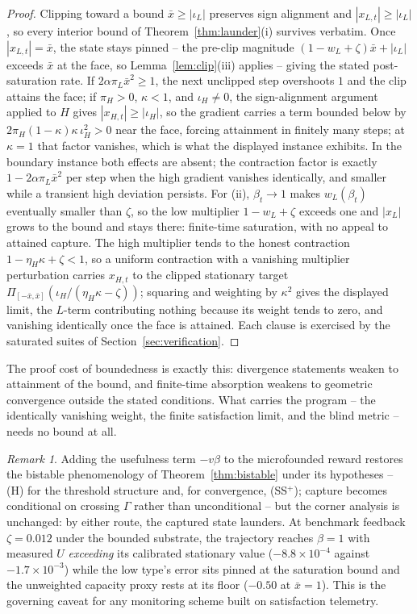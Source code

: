 \documentclass[11pt]{article}
\theoremstyle{definition}
\theoremstyle{remark}
\newtheorem{remark}[theorem]{Remark}
\numberwithin{equation}{section}
\begin{document}
\begin{proof}
Clipping toward a bound $\bar x \ge |\iota_L|$ preserves sign alignment and $|x_{L,t}| \ge |\iota_L|$, so every interior bound of Theorem~\ref{thm:launder}(i) survives verbatim. Once $|x_{L,t}| = \bar x$, the state stays pinned -- the pre-clip magnitude $(1-w_L+\zeta)\bar x + |\iota_L|$ exceeds $\bar x$ at the face, so Lemma~\ref{lem:clip}(iii) applies -- giving the stated post-saturation rate. If $2\alpha\pi_L\bar x^2 \ge 1$, the next unclipped step overshoots $1$ and the clip attains the face; if $\pi_H > 0$, $\kappa < 1$, and $\iota_H \neq 0$, the sign-alignment argument applied to $H$ gives $|x_{H,t}| \ge |\iota_H|$, so the gradient carries a term bounded below by $2\pi_H(1-\kappa)\kappa\,\iota_H^2 > 0$ near the face, forcing attainment in finitely many steps; at $\kappa = 1$ that factor vanishes, which is what the displayed instance exhibits. In the boundary instance both effects are absent; the contraction factor is exactly $1 - 2\alpha\pi_L\bar x^2$ per step when the high gradient vanishes identically, and smaller while a transient high deviation persists. For (ii), $\beta_t \to 1$ makes $w_L(\beta_t)$ eventually smaller than $\zeta$, so the low multiplier $1-w_L+\zeta$ exceeds one and $|x_L|$ grows to the bound and stays there: finite-time saturation, with no appeal to attained capture. The high multiplier tends to the honest contraction $1-\eta_H\kappa+\zeta < 1$, so a uniform contraction with a vanishing multiplier perturbation carries $x_{H,t}$ to the clipped stationary target $\Pi_{[-\bar x,\bar x]}(\iota_H/(\eta_H\kappa-\zeta))$; squaring and weighting by $\kappa^2$ gives the displayed limit, the $L$-term contributing nothing because its weight tends to zero, and vanishing identically once the face is attained. Each clause is exercised by the saturated suites of Section~\ref{sec:verification}.
\end{proof}

The proof cost of boundedness is exactly this: divergence statements weaken to attainment of the bound, and finite-time absorption weakens to geometric convergence outside the stated conditions. What carries the program -- the identically vanishing weight, the finite satisfaction limit, and the blind metric -- needs no bound at all.

\begin{remark}\label{rem:unify}
Adding the usefulness term $-v\beta$ to the microfounded reward restores the bistable phenomenology of Theorem~\ref{thm:bistable} under its hypotheses -- (H) for the threshold structure and, for convergence, (SS$^+$); capture becomes conditional on crossing $\Gamma$ rather than unconditional -- but the corner analysis is unchanged: by either route, the captured state launders. At benchmark feedback $\zeta = 0.012$ under the bounded substrate, the trajectory reaches $\beta = 1$ with measured $U$ \emph{exceeding} its calibrated stationary value ($-8.8\times 10^{-4}$ against $-1.7\times 10^{-3}$) while the low type's error sits pinned at the saturation bound and the unweighted capacity proxy rests at its floor ($-0.50$ at $\bar x = 1$). This is the governing caveat for any monitoring scheme built on satisfaction telemetry.
\end{remark}
\end{document}
